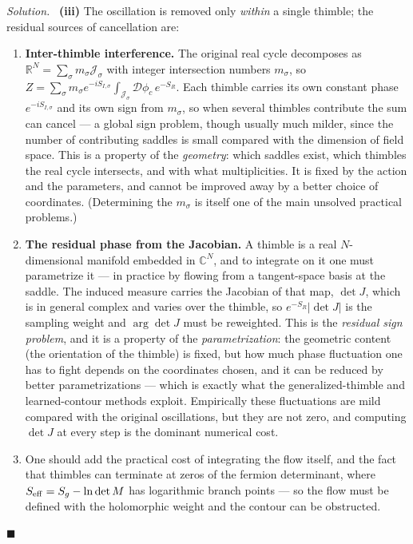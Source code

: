 \documentclass[11pt]{article}
\newenvironment{solution}{\par\smallskip\noindent\textit{Solution.}\ }{\hfill$\blacksquare$\par\smallskip}
\begin{document}
\begin{solution}
\textbf{(iii)} The oscillation is removed only \emph{within} a single thimble; the residual sources of cancellation are:
\begin{enumerate}[label=(\alph*), leftmargin=*]
  \item \textbf{Inter-thimble interference.} The original real cycle decomposes as $\mathbb{R}^N = \sum_\sigma m_\sigma \mathcal{J}_\sigma$ with integer intersection numbers $m_\sigma$, so
  $Z = \sum_\sigma m_\sigma e^{-iS_{I,\sigma}}\int_{\mathcal{J}_\sigma}\mathcal{D}\phi_c\,e^{-S_R}$. Each thimble carries its own constant phase $e^{-iS_{I,\sigma}}$ and its own sign from $m_\sigma$, so when several thimbles contribute the sum can cancel --- a global sign problem, though usually much milder, since the number of contributing saddles is small compared with the dimension of field space. This is a property of the \emph{geometry}: which saddles exist, which thimbles the real cycle intersects, and with what multiplicities. It is fixed by the action and the parameters, and cannot be improved away by a better choice of coordinates. (Determining the $m_\sigma$ is itself one of the main unsolved practical problems.)
  \item \textbf{The residual phase from the Jacobian.} A thimble is a real $N$-dimensional manifold embedded in $\mathbb{C}^N$, and to integrate on it one must parametrize it --- in practice by flowing from a tangent-space basis at the saddle. The induced measure carries the Jacobian of that map, $\det J$, which is in general complex and varies over the thimble, so $e^{-S_R}|\det J|$ is the sampling weight and $\arg\det J$ must be reweighted. This is the \emph{residual sign problem}, and it is a property of the \emph{parametrization}: the geometric content (the orientation of the thimble) is fixed, but how much phase fluctuation one has to fight depends on the coordinates chosen, and it can be reduced by better parametrizations --- which is exactly what the generalized-thimble and learned-contour methods exploit. Empirically these fluctuations are mild compared with the original oscillations, but they are not zero, and computing $\det J$ at every step is the dominant numerical cost.
  \item One should add the practical cost of integrating the flow itself, and the fact that thimbles can terminate at zeros of the fermion determinant, where $S_{\rm eff} = S_g - \ln\det M$ has logarithmic branch points --- so the flow must be defined with the holomorphic weight and the contour can be obstructed.
\end{enumerate}

\end{solution}
\end{document}
